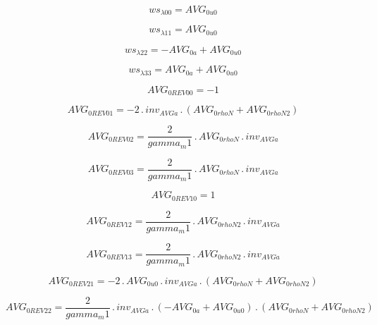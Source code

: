 \documentclass{article}
\begin{document}
\begin{dmath}ws_{\lambda 00} = AVG_{0 u0}\end{dmath}

\begin{dmath}ws_{\lambda 11} = AVG_{0 u0}\end{dmath}

\begin{dmath}ws_{\lambda 22} = - AVG_{0 a} + AVG_{0 u0}\end{dmath}

\begin{dmath}ws_{\lambda 33} = AVG_{0 a} + AVG_{0 u0}\end{dmath}

\begin{dmath}AVG_{0 REV 00} = -1\end{dmath}

\begin{dmath}AVG_{0 REV 01} = - 2 \,.\, inv_{AVG a} \,.\, \left(AVG_{0 rhoN} + AVG_{0 rhoN2}\right)\end{dmath}

\begin{dmath}AVG_{0 REV 02} = \frac{2}{gamma_m1} \,.\, AVG_{0 rhoN} \,.\, inv_{AVG a}\end{dmath}

\begin{dmath}AVG_{0 REV 03} = \frac{2}{gamma_m1} \,.\, AVG_{0 rhoN} \,.\, inv_{AVG a}\end{dmath}

\begin{dmath}AVG_{0 REV 10} = 1\end{dmath}

\begin{dmath}AVG_{0 REV 12} = \frac{2}{gamma_m1} \,.\, AVG_{0 rhoN2} \,.\, inv_{AVG a}\end{dmath}

\begin{dmath}AVG_{0 REV 13} = \frac{2}{gamma_m1} \,.\, AVG_{0 rhoN2} \,.\, inv_{AVG a}\end{dmath}

\begin{dmath}AVG_{0 REV 21} = - 2 \,.\, AVG_{0 u0} \,.\, inv_{AVG a} \,.\, \left(AVG_{0 rhoN} + AVG_{0 rhoN2}\right)\end{dmath}

\begin{dmath}AVG_{0 REV 22} = \frac{2}{gamma_m1} \,.\, inv_{AVG a} \,.\, \left(- AVG_{0 a} + AVG_{0 u0}\right) \,.\, \left(AVG_{0 rhoN} + AVG_{0 rhoN2}\right)\end{dmath}
\end{document}
